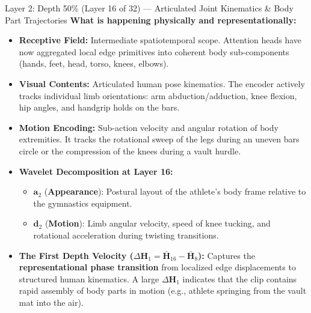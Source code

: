 \documentclass[a4paper, 11pt]{article}
\begin{document}
\begin{layerbox}{Layer 2: Depth 50\% (Layer 16 of 32) --- Articulated Joint Kinematics \& Body Part Trajectories}
\textbf{What is happening physically and representationally:}
\begin{itemize}
    \item \textbf{Receptive Field:} Intermediate spatiotemporal scope. Attention heads have now aggregated local edge primitives into coherent body sub-components (hands, feet, head, torso, knees, elbows).
    \item \textbf{Visual Contents:} Articulated human pose kinematics. The encoder actively tracks individual limb orientations: arm abduction/adduction, knee flexion, hip angles, and handgrip holds on the bars.
    \item \textbf{Motion Encoding:} Sub-action velocity and angular rotation of body extremities. It tracks the rotational sweep of the legs during an uneven bars circle or the compression of the knees during a vault hurdle.
    \item \textbf{Wavelet Decomposition at Layer 16:}
    \begin{itemize}
        \item $\mathbf{a}_2$ (\textbf{Appearance}): Postural layout of the athlete's body frame relative to the gymnastics equipment.
        \item $\mathbf{d}_2$ (\textbf{Motion}): Limb angular velocity, speed of knee tucking, and rotational acceleration during twisting transitions.
    \end{itemize}
    \item \textbf{The First Depth Velocity ($\Delta\mathbf{H}_1 = \bar{\mathbf{H}}_{16} - \bar{\mathbf{H}}_8$):}
    Captures the \textbf{representational phase transition} from localized edge displacements to structured human kinematics. A large $\Delta\mathbf{H}_1$ indicates that the clip contains rapid assembly of body parts in motion (e.g., athlete springing from the vault mat into the air).
\end{itemize}
\end{layerbox}

\vspace{0.3cm}
\end{document}
